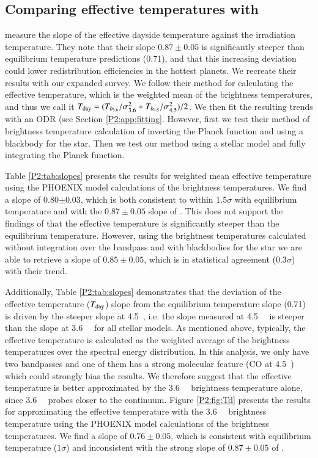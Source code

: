 \begin{subappendices}
\section{Comparing effective temperatures with \citet{Schwartz2015}}
\label{P2:app:schwartzcomparison}

\citet{Schwartz2015} measure the slope of the effective dayside temperature against the irradiation temperature. They note that their slope $0.87\pm0.05$ is significantly steeper than equilibrium temperature predictions (0.71), and that this increasing deviation could  lower redistribution efficiencies in the hottest planets. We recreate their results with our expanded survey. We follow their method for calculating the effective temperature, which is the weighted mean of the brightness temperatures, and thus we call it $T_{\rm day} = (T_{b_{3.6}}/ \sigma_{3.6}^2 +  T_{b_{4.5}}/\sigma_{4.5}^2) / 2 $. We then fit the resulting trends with an ODR (see Section \ref{P2:app:fitting}. However, first we test their method of brightness temperature calculation of inverting the Planck function and using a blackbody for the star. Then we test our method using a stellar model and fully integrating the Planck function.

Table \ref{P2:tab:slopes} presents the results for weighted mean effective temperature using the PHOENIX model calculations of the brightness temperatures. We find a slope of 0.80$\pm$0.03, which is both consistent to within 1.5$\sigma$ with equilibrium temperature and with the $0.87\pm0.05$ slope of \citet{Schwartz2015}. This does not support the findings of \citet{Schwartz2015} that the effective temperature is significantly steeper than the equilibrium temperature. However, using the brightness temperatures calculated without integration over the bandpass and with blackbodies for the star we are able to retrieve a slope of $0.85\pm0.05$, which is in statistical agreement (0.3$\sigma$) with their trend.

Additionally, Table \ref{P2:tab:slopes} demonstrates that the deviation of the effective temperature ($T_{\rm day}$) slope from the equilibrium temperature slope (0.71) is driven by the steeper slope at 4.5~\um, i.e. the slope measured at 4.5~\um~ is steeper than the slope at 3.6~\um~ for all stellar models. As mentioned above, typically, the effective temperature is calculated as the weighted average of the brightness temperatures over the spectral energy distribution. In this analysis, we only have two bandpasses and one of them has a strong molecular feature (CO at 4.5~\um) which could strongly bias the results. We therefore suggest that the effective temperature is better approximated by the 3.6~\um~ brightness temperature alone, since 3.6~\um~ probes closer to the continuum. Figure \ref{P2:fig:Td} presents the results for approximating the effective temperature with the 3.6~\um~ brightness temperature using the PHOENIX model calculations of the brightness temperatures. We find a slope of $0.76\pm0.05$, which is consistent with equilibrium temperature ($1\sigma$) and inconsistent with the strong slope of $0.87\pm0.05$ of \citet{Schwartz2015}.


\end{subappendices}

